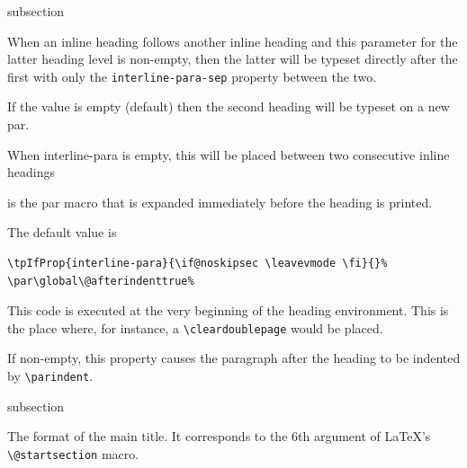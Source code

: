 \begin{heading}[label=sec:hdg:props:para]{subsection}
\end{heading}


When an inline heading follows another inline heading and this
parameter for the latter heading level is non-empty, then the latter
will be typeset directly after the first with only the
\texttt{interline-para-sep} property between the two.

If the value is empty (default) then the second heading will be
typeset on a new par.


When interline-para is empty, this will be placed between two
consecutive inline headings
\Hack{\newpage}


is the par macro that is expanded immediately before the heading is printed.

The default value is
\begin{lstlisting}[style=tex]
\tpIfProp{interline-para}{\if@noskipsec \leavevmode \fi}{}%
\par\global\@afterindenttrue%
\end{lstlisting}


This code is executed at the very beginning of the heading
environment. This is the place where, for instance, a
\lstinline{\cleardoublepage} would be placed.



If non-empty, this property causes the paragraph after the heading to
be indented by \lstinline{\parindent}.


\begin{heading}[label=sec:hdg:props:format]{subsection}
\end{heading}


The format of the main title. It corresponds to the 6th argument of
\LaTeX's \lstinline{\@startsection} macro.


